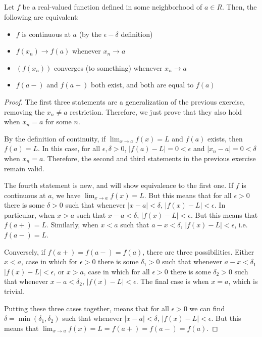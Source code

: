 \subsection{}  Let $f$ be a real-valued function defined in some neighborhood of $a \in R$. Then, the following are equivalent:

\begin{itemize}
    \item  $f$ is continuous at $a$ (by the $\epsilon - \delta$ definition)
    \item $f(x_n) \rightarrow f(a)$ whenever $x_n \rightarrow a$
    \item $(f(x_n))$ converges (to something) whenever $x_n \rightarrow a$
    \item $f(a-)$ and $f(a+)$ both exist, and both are equal to $f(a)$
\end{itemize}

\begin{proof}
The first three statements are a generalization of the previous exercise, removing the $x_n \neq a$ restriction. Therefore, we just prove that they also hold when $x_n=a$ for some $n$.

By the definition of continuity, if $\lim_{x\rightarrow a} f(x) = L$ and $f(a)$ exists, then $f(a) = L$. In this case, for all $\epsilon, \delta > 0$, $|f(a) - L| = 0 < \epsilon$ and $|x_n - a| = 0 < \delta$ when $x_n = a$. Therefore, the second and third statements in the previous exercise remain valid.

The fourth statement is new, and will show equivalence to the first one. If $f$ is continuous at $a$, we have $\lim_{x\rightarrow a} f(x) = L$. But this means that for all $\epsilon > 0$ there is some $\delta>0$ such that whenever $|x-a|<\delta$, $|f(x)-L|<\epsilon$. In particular, when $x>a$ such that $x-a < \delta$, $|f(x)-L|<\epsilon$. But this means that $f(a+)=L$. Similarly, when $x<a$ such that $a-x < \delta$, $|f(x)-L|<\epsilon$, i.e. $f(a-)=L$.

Conversely, if $f(a+) = f(a-) = f(a)$, there are three possibilities. Either $x<a$, case in which for $\epsilon > 0$ there is some $\delta_1 > 0$ such that whenever $a-x < \delta_1$ $|f(x)-L|<\epsilon$, or  $x>a$, case in which for all $\epsilon > 0$ there is some $\delta_2 > 0$ such that whenever $x-a < \delta_2$, $|f(x)-L|<\epsilon$. The final case is when $x=a$, which is trivial.

Putting these three cases together, means that for all $\epsilon>0$ we can find $\delta = \min(\delta_1, \delta_2)$ such that whenever $|x-a|<\delta$, $|f(x)-L|<\epsilon$. But this means that $\lim_{x\rightarrow a} f(x) = L = f(a+) = f(a-) = f(a)$.

\end{proof}

